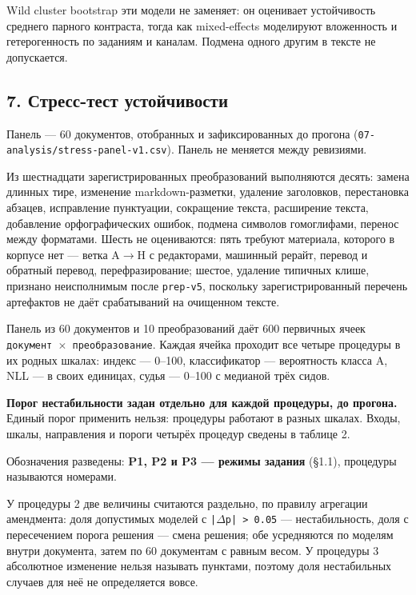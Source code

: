 \documentclass[11pt,a4paper]{article}
\renewcommand{\_}{\textunderscore\allowbreak}
\begin{document}
Wild cluster bootstrap эти модели не заменяет: он оценивает устойчивость среднего
парного контраста, тогда как mixed-effects моделируют вложенность и
гетерогенность по заданиям и каналам. Подмена одного другим в тексте не
допускается.

\subsection{7. Стресс-тест устойчивости}

Панель — 60 документов, отобранных и зафиксированных до прогона
(\texttt{07-\allowbreak{}analysis/stress-\allowbreak{}panel-\allowbreak{}v1.csv}). Панель не меняется между ревизиями.

Из шестнадцати зарегистрированных преобразований выполняются десять: замена
длинных тире, изменение markdown-разметки, удаление заголовков, перестановка
абзацев, исправление пунктуации, сокращение текста, расширение текста, добавление
орфографических ошибок, подмена символов гомоглифами, перенос между форматами.
Шесть не оцениваются: пять требуют материала, которого в корпусе нет — ветка
A$\to$H с редакторами, машинный рерайт, перевод и обратный перевод, перефразирование;
шестое, удаление типичных клише, признано неисполнимым после \texttt{prep-\allowbreak{}v5}, поскольку
зарегистрированный перечень артефактов не даёт срабатываний на очищенном тексте.

Панель из 60 документов и 10 преобразований даёт 600 первичных ячеек
\texttt{документ $\times$ преобразование}. Каждая ячейка проходит все четыре процедуры в их
родных шкалах: индекс — 0–100, классификатор — вероятность класса A, NLL — в
своих единицах, судья — 0–100 с медианой трёх сидов.

\textbf{Порог нестабильности задан отдельно для каждой процедуры, до прогона.} Единый
порог применить нельзя: процедуры работают в разных шкалах. Входы, шкалы,
направления и пороги четырёх процедур сведены в таблице 2.

Обозначения разведены: \textbf{P1, P2 и P3 — режимы задания} (§1.1), процедуры
называются номерами.

\setcounter{table}{1}


У процедуры 2 две величины считаются раздельно, по правилу агрегации
амендмента: доля допустимых моделей с \texttt{|$\Delta$p| > 0.05} — нестабильность, доля с
пересечением порога решения — смена решения; обе усредняются по моделям внутри
документа, затем по 60 документам с равным весом.
У процедуры 3 абсолютное изменение нельзя называть пунктами, поэтому доля
нестабильных случаев для неё не определяется вовсе.
\end{document}
